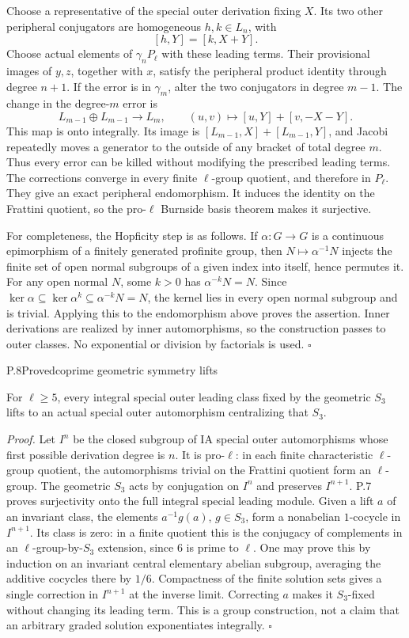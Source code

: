 Choose a representative of the special outer derivation fixing $X$.
Its two other peripheral conjugators are homogeneous $h,k\in L_n$,
with
\[
             [h,Y]=[k,X+Y].
\]
Choose actual elements of $\gamma_nP_\ell$ with these leading terms.
Their provisional images of $y,z$, together with $x$, satisfy the
peripheral product identity through degree $n+1$. If the error is in
$\gamma_m$, alter the two conjugators in degree $m-1$. The change
in the degree-$m$ error is
\[
 L_{m-1}\oplus L_{m-1}\longrightarrow L_m,
 \qquad (u,v)\longmapsto[u,Y]+[v,-X-Y].
\]
This map is onto integrally. Its image is
$[L_{m-1},X]+[L_{m-1},Y]$, and Jacobi repeatedly moves a generator
to the outside of any bracket of total degree $m$. Thus every error
can be killed without modifying the prescribed leading terms.
The corrections converge in every finite $\ell$-group quotient,
and therefore in $P_\ell$. They give an exact peripheral endomorphism.
It induces the identity on the Frattini quotient, so the pro-$\ell$
Burnside basis theorem makes it surjective.

For completeness, the Hopficity step is as follows. If $\alpha:G\to G$
is a continuous epimorphism of a finitely generated profinite group,
then $N\mapsto\alpha^{-1}N$ injects the finite set of open normal
subgroups of a given index into itself, hence permutes it. For any
open normal $N$, some $k>0$ has $\alpha^{-k}N=N$. Since
$\ker\alpha\subseteq\ker\alpha^k\subseteq\alpha^{-k}N=N$,
the kernel lies in every open normal subgroup and is trivial.
Applying this to the endomorphism above proves the assertion.
Inner derivations are realized by inner automorphisms, so the
construction passes to outer classes. No exponential or division by
factorials is used. \hfill$\square$

\begin{statement}{P.8}{Proved}{coprime geometric symmetry lifts}
\end{statement}
For $\ell\geq5$, every integral special outer leading class fixed by
the geometric $S_3$ lifts to an actual special outer automorphism
centralizing that $S_3$.

\emph{Proof.}
Let $I^n$ be the closed subgroup of IA special outer automorphisms
whose first possible derivation degree is $n$. It is pro-$\ell$:
in each finite characteristic $\ell$-group quotient, the automorphisms
trivial on the Frattini quotient form an $\ell$-group. The geometric
$S_3$ acts by conjugation on $I^n$ and preserves $I^{n+1}$.
P.7 proves surjectivity onto the full integral special leading module.
Given a lift $a$ of an invariant class, the elements $a^{-1}g(a)$,
$g\in S_3$, form a nonabelian $1$-cocycle in $I^{n+1}$.
Its class is zero: in a finite quotient this is the conjugacy of
complements in an $\ell$-group-by-$S_3$ extension, since $6$ is
prime to $\ell$. One may prove this by induction on an invariant
central elementary abelian subgroup, averaging the additive
cocycles there by $1/6$. Compactness of the finite solution sets
gives a single correction in $I^{n+1}$ at the inverse limit.
Correcting $a$ makes it $S_3$-fixed without changing its leading
term. This is a group construction, not a claim that an arbitrary
graded solution exponentiates integrally. \hfill$\square$

